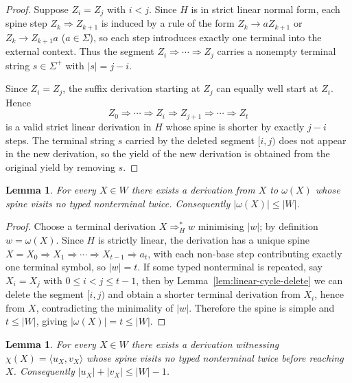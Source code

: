 \documentclass[11pt,a4paper]{article}
\newtheorem{lemma}[theorem]{Lemma}
\begin{document}
\begin{proof}
Suppose $Z_i=Z_j$ with $i<j$.
Since $H$ is in strict linear normal form, each spine step $Z_k\Rightarrow Z_{k+1}$
is induced by a rule of the form $Z_k\to aZ_{k+1}$ or $Z_k\to Z_{k+1}a$
($a\in\Sigma$), so each step introduces exactly one terminal into the external context.
Thus the segment $Z_i\Rightarrow\cdots\Rightarrow Z_j$ carries a nonempty terminal
string $s\in\Sigma^+$ with $|s|=j-i$.

Since $Z_i=Z_j$, the suffix derivation starting at $Z_j$ can equally well start at $Z_i$.
Hence
\[
  Z_0\Rightarrow\cdots\Rightarrow Z_i\Rightarrow Z_{j+1}\Rightarrow\cdots\Rightarrow Z_t
\]
is a valid strict linear derivation in $H$ whose spine is shorter by exactly $j-i$ steps.
The terminal string $s$ carried by the deleted segment $[i,j)$ does not appear in the
new derivation, so the yield of the new derivation is obtained from the original yield
by removing $s$.
\end{proof}

\begin{lemma}
\label{lem:linear-shortyield}
For every $X\in W$ there exists a derivation from $X$ to $\omega(X)$ whose spine
visits no typed nonterminal twice.
Consequently $|\omega(X)|\le |W|$.
\end{lemma}

\begin{proof}
Choose a terminal derivation $X\Rightarrow_H^* w$ minimising $|w|$; by definition
$w=\omega(X)$.
Since $H$ is strictly linear, the derivation has a unique spine
$X=X_0\Rightarrow X_1\Rightarrow\cdots\Rightarrow X_{t-1}\Rightarrow a_t$,
with each non-base step contributing exactly one terminal symbol, so $|w|=t$.
If some typed nonterminal is repeated, say $X_i=X_j$ with $0\le i<j\le t-1$,
then by Lemma~\ref{lem:linear-cycle-delete} we can delete the segment $[i,j)$
and obtain a shorter terminal derivation from $X_i$, hence from $X$,
contradicting the minimality of $|w|$.
Therefore the spine is simple and $t\le|W|$, giving $|\omega(X)|=t\le|W|$.
\end{proof}

\begin{lemma}
\label{lem:linear-shortcontext}
For every $X\in W$ there exists a derivation witnessing $\chi(X)=\langle u_X,v_X\rangle$
whose spine visits no typed nonterminal twice before reaching $X$.
Consequently $|u_X|+|v_X|\le|W|-1$.
\end{lemma}
\end{document}
